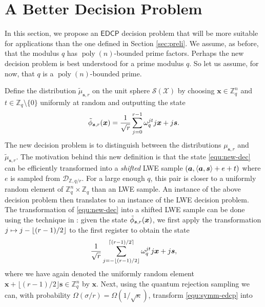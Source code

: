 \documentclass[11pt]{article}
\theoremstyle{plain}
\theoremstyle{definition}
\DeclareMathOperator{\poly}{poly}
\let\ket\relax
\DeclarePairedDelimiter{\ket}{\lvert}{\rangle}
\DeclarePairedDelimiter{\lrang}{\langle}{\rangle}
\def\Z{\mathbb{Z}}
\def\edcp{\mathsf{EDCP}}
\def\SX{\mathcal{S(X)}}
\begin{document}



\section{A Better Decision Problem}
\label{sec:new-decsn}

In this section, we propose an $\edcp$ decision problem that will be more suitable for applications than the one defined in Section \ref{sec:preli}. We assume, as before, that the modulus $q$ has $\poly(n)$-bounded prime factors. Perhaps the new decision problem is best understood for a prime modulus $q$. So let us assume, for now, that $q$ is a $\poly(n)$-bounded prime. 

Define the distribution $\tilde{\mu}_{\bm{s}, r}$ on the unit sphere $\SX$ by choosing $\bm{x} \in \Z_q^n$ and $t \in \Z_q {\setminus} \{ 0 \}$ uniformly at random and outputting the state
\begin{equation}
    \label{equ:new-dec}
    \ket{\tilde{\phi}_{\bm{s}, r}(\bm{x})} = \frac{1}{\sqrt{r}} \sum_{j = 0}^{r - 1} \omega_q^{jt} \ket{j}\ket{\bm{x} + j\bm{s}}.
\end{equation}
The new decision problem is to distinguish between the distributions $\mu_{\bm{s}, r}$ and $\tilde{\mu}_{\bm{s}, r}$. The motivation behind this new definition is that the state \eqref{equ:new-dec} can be efficiently transformed into a \textit{shifted} LWE sample $(\bm{a}, \lrang{\bm{a}, \bm{s}} + e + t)$ where $e$ is sampled from $\mathcal{D}_{\Z, q / r}$. For a large enough $q$, this pair is closer to a uniformly random element of $\Z_q^n \times \Z_q$ than an LWE sample. An instance of the above decision problem then translates to an instance of the LWE decision problem. The transformation of \eqref{equ:new-dec} into a shifted LWE sample can be done using the technique in \cite{brakerski2018learning}: given the state $\ket{\tilde{\phi}_{\bm{s}, r}(\bm{x})}$, we first apply the transformation $\ket{j} \mapsto \ket{j - \lfloor (r - 1) / 2 \rfloor}$ to the first register to obtain the state
\begin{equation}
    \label{equ:symm-edcp}
    \frac{1}{\sqrt{r}} \sum_{j = -\lfloor (r - 1) / 2 \rfloor}^{\lceil (r - 1) / 2 \rceil} \omega_q^{jt} \ket{j}\ket{\bm{x} + j\bm{s}},
\end{equation}
where we have again denoted the uniformly random element $\bm{x} + \lfloor (r - 1) / 2 \rfloor \bm{s} \in \Z_q^n$ by $\bm{x}$. Next, using the quantum rejection sampling we can, with probability $\Omega(\sigma / r) = \Omega(1 / \sqrt{\kappa})$, transform \eqref{equ:symm-edcp} into 
\end{document}
